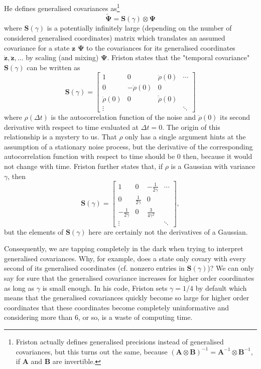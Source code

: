 \documentclass[a4paper,10pt]{article}
\newcommand{\bs}[1]{\mathbf{#1}}					%
\newcommand{\bgs}[1]{\boldsymbol{#1}}				%
\newcommand{\eq}[1]{\begin{equation} #1 \end{equation}}%
\newcommand{\gc}[1]{\tilde{#1}} %
\renewcommand{\ss}{z}         %
\newcommand{\ps}{\bs{\ss}}    %
\begin{document}
He defines generalised covariances as\footnote{Friston actually defines generalised precisions instead of generalised covariances, but this turns out the same, because $(\bs{A}\otimes\bs{B})^{-1} = \bs{A}^{-1}\otimes\bs{B}^{-1}$, if $\bs{A}$ and $\bs{B}$ are invertible.}
\eq{
    \gc{\bgs{\Psi}} = \bs{S}(\gamma) \otimes \bgs{\Psi}
}
where $\bs{S}(\gamma)$ is a potentially infinitely large (depending on the number of considered generalised coordinates) matrix which translates an assumed covariance for a state $\ps$ $\bgs{\Psi}$ to the covariances for its generalised coordinates $\dot{\ps}, \ddot{\ps}, \dots$ by scaling (and mixing) $\bgs{\Psi}$. Friston states that the "temporal covariance" $\bs{S}(\gamma)$ can be written as
\eq{
    \bs{S}(\gamma) = \left[\begin{array}{cccc} 1 & 0 & \ddot{\rho}(0) & \cdots\\
0 & - \ddot{\rho}(0) & 0 &\\
 \ddot{\rho}(0) & 0 & \ddot{\ddot{\rho}}(0) & \\
\vdots & & & \ddots
\end{array}\right]
}
where $\rho(\Delta t)$ is the autocorrelation function of the noise and $\ddot{\rho}(0)$ its second derivative with respect to time evaluated at $\Delta t = 0$. The origin of this relationship is a mystery to us. That $\rho$ only has a single argument hints at the assumption of a stationary noise process, but the derivative of the corresponding autocorrelation function with respect to time should be 0 then, because it would not change with time. Friston further states that, if $\rho$ is a Gaussian with variance $\gamma$, then
\eq{
    \bs{S}(\gamma) = \left[\begin{array}{cccc} 1 & 0 & -\frac{1}{2\gamma} & \cdots\\
0 & \frac{1}{2\gamma} & 0 &\\
-\frac{1}{2\gamma} & 0 & \frac{3}{4\gamma^2} & \\
\vdots & & & \ddots
\end{array}\right],
}
but the elements of $\bs{S}(\gamma)$ here are certainly not the derivatives of a Gaussian. 

Consequently, we are tapping completely in the dark when trying to interpret generalised covariances. Why, for example, does a state only covary with every second of its generalised coordinates (cf. nonzero entries in $\bs{S}(\gamma)$)? We can only say for sure that the generalised covariance increases for higher order coordinates as long as $\gamma$ is small enough. In his code, Friston sets $\gamma = 1/4$ by default which means that the generalised covariances quickly become so large for higher order coordinates that these coordinates become completely uninformative and considering more than 6, or so, is a waste of computing time.
\end{document}
